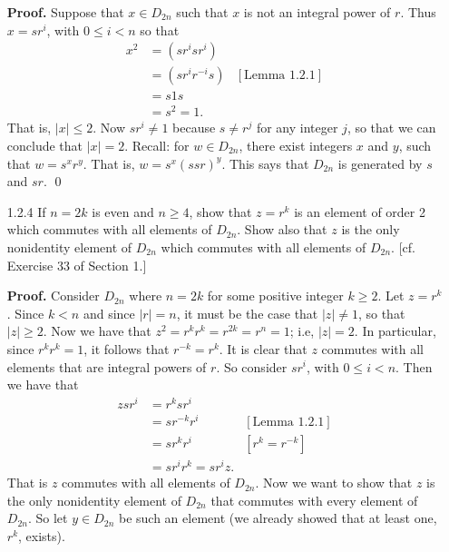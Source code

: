 \begin{enumerate}
      \textbf{Proof.} Suppose that $x \in D_{2n}$ such that $x$ is not an
      integral power of $r$. Thus $x = sr^i$, with $0 \le i < n$ so that
      \begin{align*}
         x^2 &= (sr^isr^i) \\
             &= (sr^ir^{-i}s) &[\text{Lemma 1.2.1}] \\
             &= s1s \\
             &= s^2 = 1.
      \end{align*}
      That is, $|x| \le 2$. Now $sr^i \neq 1$ because $s \neq r^j$ for any
      integer $j$, so that we can conclude that $|x| = 2$. Recall: for
      $w \in D_{2n}$, there exist integers $x$ and $y$, such that $w = s^xr^y$.
      That is, $w = s^x(ssr)^y$. This says that $D_{2n}$ is generated by $s$ and
      $sr$. \qed
   \item[1.2.4]   If $n = 2k$ is even and $n \ge 4$, show that $z = r^k$ is an
                  element of order 2 which commutes with all elements of
                  $D_{2n}$. Show also that $z$ is the only nonidentity element
                  of $D_{2n}$ which commutes with all elements of $D_{2n}$. [cf.
                  Exercise 33 of Section 1.]
                  
      \textbf{Proof.} Consider $D_{2n}$ where $n = 2k$ for some positive integer
      $k \ge 2$. Let $z = r^k$. Since $k < n$ and since $|r| = n$, it must be
      the case that $|z| \neq 1$, so that $|z| \ge 2$. Now we have that
      $z^2 = r^kr^k = r^{2k} = r^n = 1$; i.e, $|z| = 2$. In particular, since
      $r^kr^k = 1$, it follows that $r^{-k} = r^k$. It is clear that $z$
      commutes with all elements that are integral powers of $r$. So consider
      $sr^i$, with $0 \le i < n$. Then we have that
      \begin{align*}
         zsr^i &= r^ksr^i \\
               &= sr^{-k}r^i  &[\text{Lemma 1.2.1}] \\
               &= sr^kr^i     &[r^k = r^{-k}] \\
               &= sr^ir^k = sr^iz.
      \end{align*}
      That is $z$ commutes with all elements of $D_{2n}$. Now we want to show
      that $z$ is the only nonidentity element of $D_{2n}$ that commutes with
      every element of $D_{2n}$. So let $y \in D_{2n}$ be such an element (we
      already showed that at least one, $r^k$, exists).
      

\end{enumerate}
